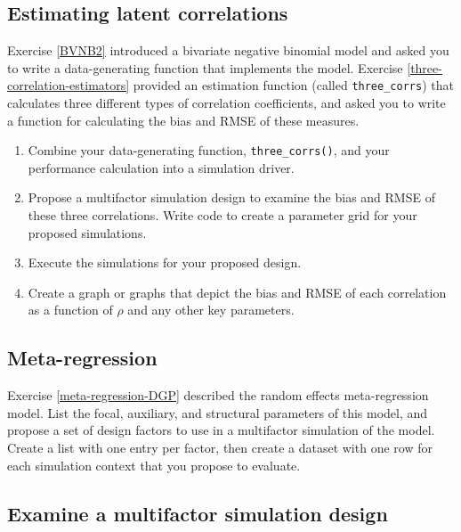 \documentclass[
]{book}
\begin{document}
\subsection{Estimating latent correlations}\label{exercise:multifactor-latent-correlation}

Exercise \ref{BVNB2} introduced a bivariate negative binomial model and asked you to write a data-generating function that implements the model. Exercise \ref{three-correlation-estimators} provided an estimation function (called \texttt{three\_corrs}) that calculates three different types of correlation coefficients, and asked you to write a function for calculating the bias and RMSE of these measures.

\begin{enumerate}
\def\labelenumi{\arabic{enumi}.}
\item
  Combine your data-generating function, \texttt{three\_corrs()}, and your performance calculation into a simulation driver.
\item
  Propose a multifactor simulation design to examine the bias and RMSE of these three correlations. Write code to create a parameter grid for your proposed simulations.
\item
  Execute the simulations for your proposed design.
\item
  Create a graph or graphs that depict the bias and RMSE of each correlation as a function of \(\rho\) and any other key parameters.
\end{enumerate}

\subsection{Meta-regression}\label{exercise:multifactor-meta-regression}

Exercise \ref{meta-regression-DGP} described the random effects meta-regression model.
List the focal, auxiliary, and structural parameters of this model, and propose a set of design factors to use in a multifactor simulation of the model.
Create a list with one entry per factor, then create a dataset with one row for each simulation context that you propose to evaluate.

\subsection{Examine a multifactor simulation design}\label{exercise:examine-a-multifactor-simulation-design}
\end{document}
